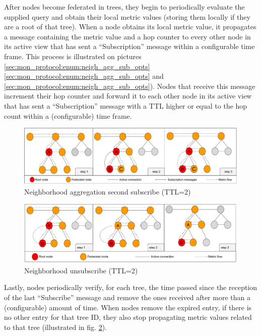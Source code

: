 After nodes become federated in trees, they begin to periodically evaluate the supplied query and obtain their local metric values (storing them locally if they are a root of that tree). When a node obtains its local metric value, it propagates a message containing the metric value and a hop counter to every other node in its active view that has sent a ``Subscription'' message within a configurable time frame. This process is illustrated on pictures \ref{sec:mon_protocol:enum:neigh_agg_sub_opts} \ref{sec:mon_protocol:enum:neigh_agg_sub_opts} and \ref{sec:mon_protocol:enum:neigh_agg_sub_opts}). Nodes that receive this message increment their hop counter and forward it to each other node in its active view that has sent a ``Subscription'' message with a TTL higher or equal to the hop count within a (configurable) time frame.

\begin{figure}[htbp]
    \centering
    \includegraphics[width=\textwidth]{Chapters/aggregation/images/2nd_subscribe.pdf}
    \caption{Neighborhood aggregation second subscribe (TTL=2)}
    \label{sec:mon_protocol:img:neigh_agg_second_sub}
\end{figure}


\begin{figure}[htbp]
    \centering
    \includegraphics[width=\textwidth]{Chapters/aggregation/images/unsubscribe_process.pdf}
    \caption{Neighborhood unsubscribe (TTL=2)}
    \label{sec:mon_protocol:img:neigh_agg_unsub}
\end{figure}
    
Lastly, nodes periodically verify, for each tree, the time passed since the reception of the last ``Subscribe'' message and remove the ones received after more than a (configurable) amount of time. When nodes remove the expired entry, if there is no other entry for that tree ID, they also stop propagating metric values related to that tree (illustrated in fig. \ref{sec:mon_protocol:img:neigh_agg_unsub}).

